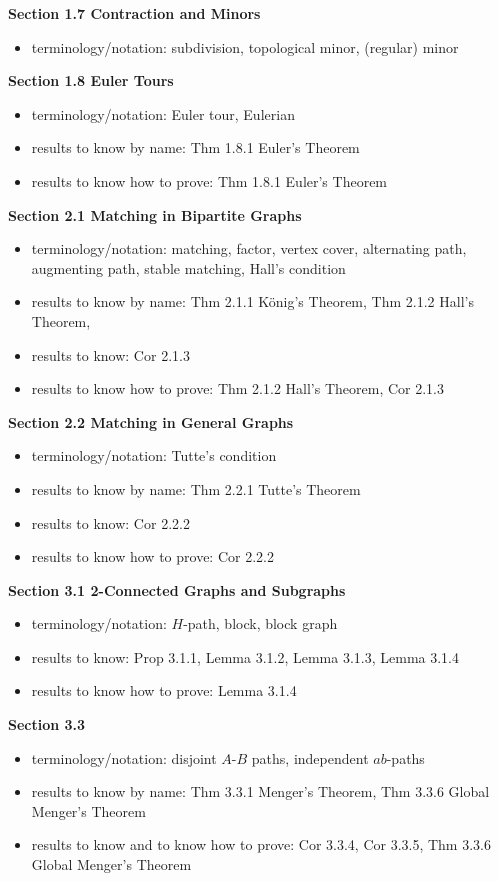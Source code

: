 \documentclass[12pt]{article}
\begin{document}
\noindent \textbf{Section 1.7 Contraction and Minors}
	\begin{itemize}
	\item terminology/notation: subdivision, topological minor, (regular) minor
	\end{itemize}
\noindent \textbf{Section 1.8 Euler Tours}
	\begin{itemize}
	\item terminology/notation: Euler tour, Eulerian
	\item results to know by name: Thm 1.8.1 Euler's Theorem
	\item results to know how to prove: Thm 1.8.1 Euler's Theorem
	\end{itemize}
\noindent \textbf{Section 2.1 Matching in Bipartite Graphs}
	\begin{itemize}
	\item terminology/notation: matching, factor, vertex cover, alternating path, augmenting path, stable matching, Hall's condition
	\item results to know by name: Thm 2.1.1 K\"{o}nig's Theorem, Thm 2.1.2 Hall's Theorem,
	\item results to know: Cor 2.1.3
	\item results to know how to prove: Thm 2.1.2 Hall's Theorem, Cor 2.1.3 
	\end{itemize}
\noindent \textbf{Section 2.2 Matching in General Graphs}
	\begin{itemize}
	\item terminology/notation: Tutte's condition
	\item results to know by name: Thm 2.2.1 Tutte's Theorem
	\item results to know: Cor 2.2.2
	\item results to know how to prove: Cor 2.2.2
	\end{itemize}
\noindent \textbf{Section 3.1 2-Connected Graphs and Subgraphs}
	\begin{itemize}
	\item terminology/notation: $H$-path, block, block graph
	\item results to know: Prop 3.1.1, Lemma 3.1.2, Lemma 3.1.3, Lemma 3.1.4
	\item results to know how to prove: Lemma 3.1.4
	\end{itemize}
\noindent \textbf{Section 3.3}
	\begin{itemize}
	\item terminology/notation: disjoint $A$-$B$ paths, independent $ab$-paths
	\item results to know by name: Thm 3.3.1 Menger's Theorem, Thm 3.3.6 Global Menger's Theorem
	\item results to know and to know how to prove: Cor 3.3.4, Cor 3.3.5, Thm 3.3.6 Global Menger's Theorem
	\end{itemize}
\end{document}
